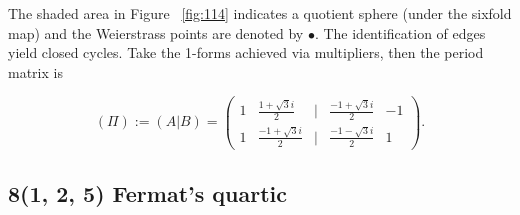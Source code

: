 \documentclass[12pt,reqno]{amsart}
\newenvironment{dami}{
  \medskip
\begin{color}{blue}
    \textcolor{purple}{\textbf{Dami:}} 
}{
\end{color}
  \medskip
}
\DeclareMathOperator{\Aut}{Aut}
\theoremstyle{definition}
\theoremstyle{remark}
\begin{document}
The shaded area in Figure~ \cref{fig:114} indicates a quotient sphere (under the sixfold map) and the Weierstrass points are denoted by $\bullet.$ The identification of edges yield closed cycles. Take the 1-forms achieved via multipliers, then the period matrix is

$$(\Pi) := (A | B) = \begin{pmatrix}1 & \frac{1 + \sqrt{3} i}{2} & | & \frac{-1 + \sqrt{3} i}{2} & -1\\
1 & \frac{-1 + \sqrt{3} i}{2} & | & \frac{-1 - \sqrt{3} i}{2} & 1 \end{pmatrix}.$$












\subsection{8(1, 2, 5) Fermat's quartic}
\end{document}
